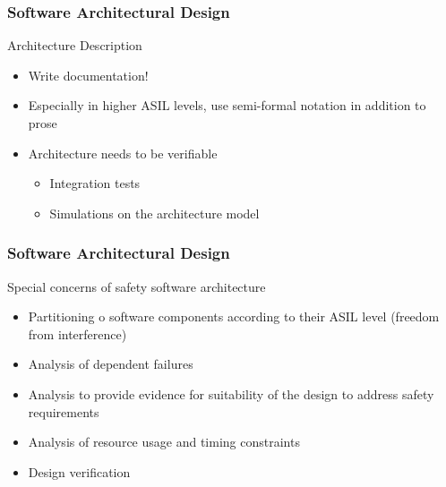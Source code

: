 \documentclass[aspectratio=169]{beamer}
\newif\iftransitions
\newcommand{\cpause}{\iftransitions \pause \fi}
\begin{document}
\begin{frame}
  \frametitle{Software Architectural Design}
  
  Architecture Description \cpause
  \begin{itemize}
  \item Write documentation! \cpause
  \item Especially in higher ASIL levels, use semi-formal notation in addition to prose \cpause
  \item Architecture needs to be verifiable
  \begin{itemize}
    \item Integration tests
    \item Simulations on the architecture model
  \end{itemize}
  \end{itemize}
\end{frame}

\begin{frame}
  \frametitle{Software Architectural Design}
  
  Special concerns of safety software architecture \cpause
  \begin{itemize}
  \item Partitioning o software components according to their ASIL level (freedom from interference) \cpause
  \item Analysis of dependent failures \cpause
  \item Analysis to provide evidence for suitability of the design to address safety requirements \cpause
  \item Analysis of resource usage and timing constraints \cpause
  \item Design verification
  \end{itemize}
  
\end{frame}
\end{document}
